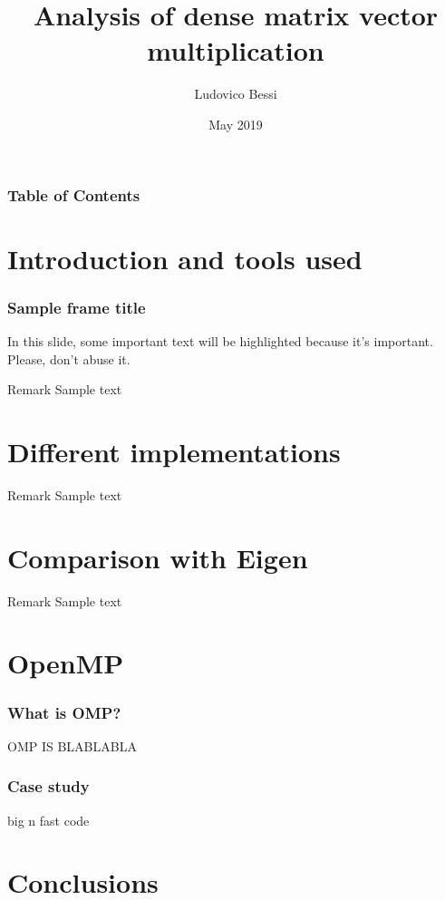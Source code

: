 \documentclass{beamer}
\title {Analysis of dense matrix vector multiplication}
\author %
{Ludovico Bessi}
\institute[VFU] %
{
  Matematica per l'ingegneria\\
  Politecnico di Torino
}
\date{May 2019}
\begin{document}
 
\frame{\titlepage}

\begin{frame}
\frametitle{Table of Contents}
\tableofcontents
\end{frame}

\section{Introduction and tools used}
\begin{frame}
\frametitle{Sample frame title}
In this slide, some important text will be
\alert{highlighted} because it's important.
Please, don't abuse it.
\begin{block}{Remark}
Sample text
\end{block}
\end{frame}



\section{Different implementations}
\begin{frame}
\begin{block}{Remark}
Sample text
\end{block}
\end{frame}

\section{Comparison with Eigen}
\begin{frame}
\begin{block}{Remark}
Sample text
\end{block}
\end{frame}

\section{OpenMP}
\begin{frame}
\frametitle{What is OMP?}
OMP IS BLABLABLA
\end{frame}

\begin{frame}
\frametitle{Case study}
big n fast code
\end{frame}

\section{Conclusions}
\end{document}

